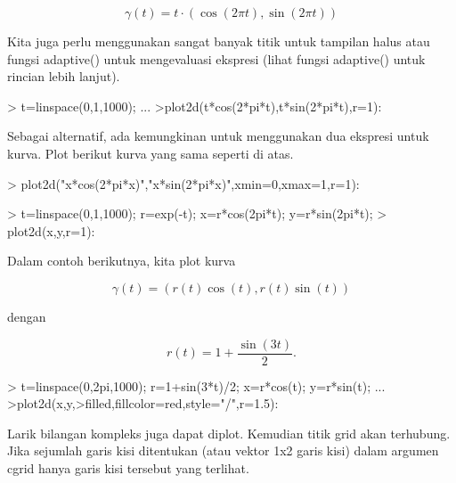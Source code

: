 \documentclass[a4paper,10pt]{article}
\begin{document}
\begin{eulernotebook}
\begin{eulercomment}
\begin{eulercomment}
\begin{eulercomment}
\begin{eulercomment}
\begin{eulercomment}
\begin{eulercomment}
\begin{eulercomment}
\end{eulercomment}
\begin{eulerformula}
\[
\gamma(t) = t \cdot (\cos(2\pi t),\sin(2\pi t))
\]
\end{eulerformula}
\begin{eulercomment}
Kita juga perlu menggunakan sangat banyak titik untuk tampilan halus
atau fungsi adaptive() untuk mengevaluasi ekspresi (lihat fungsi
adaptive() untuk rincian lebih lanjut).
\end{eulercomment}
\begin{eulerprompt}
> t=linspace(0,1,1000); ...
>plot2d(t*cos(2*pi*t),t*sin(2*pi*t),r=1):
\end{eulerprompt}
\begin{eulercomment}
Sebagai alternatif, ada kemungkinan untuk menggunakan dua ekspresi
untuk kurva. Plot berikut kurva yang sama seperti di atas.
\end{eulercomment}
\begin{eulerprompt}
> plot2d("x*cos(2*pi*x)","x*sin(2*pi*x)",xmin=0,xmax=1,r=1):
\end{eulerprompt}
\begin{eulerprompt}
> t=linspace(0,1,1000); r=exp(-t); x=r*cos(2pi*t); y=r*sin(2pi*t);
> plot2d(x,y,r=1):
\end{eulerprompt}
\begin{eulercomment}
Dalam contoh berikutnya, kita plot kurva

\end{eulercomment}
\begin{eulerformula}
\[
\gamma(t) = (r(t) \cos(t), r(t) \sin(t))
\]
\end{eulerformula}
\begin{eulercomment}
dengan

\end{eulercomment}
\begin{eulerformula}
\[
r(t) = 1 + \dfrac{\sin(3t)}{2}.
\]
\end{eulerformula}
\begin{eulerprompt}
> t=linspace(0,2pi,1000); r=1+sin(3*t)/2; x=r*cos(t); y=r*sin(t); ...
>plot2d(x,y,>filled,fillcolor=red,style="/",r=1.5):
\end{eulerprompt}
\begin{eulercomment}
Larik bilangan kompleks juga dapat diplot. Kemudian titik grid akan
terhubung. Jika sejumlah garis kisi ditentukan (atau vektor 1x2 garis
kisi) dalam argumen cgrid hanya garis kisi tersebut yang terlihat.


\end{eulercomment}
\end{eulercomment}
\end{eulercomment}
\end{eulercomment}
\end{eulercomment}
\end{eulercomment}
\end{eulercomment}
\end{eulernotebook}
\end{document}
